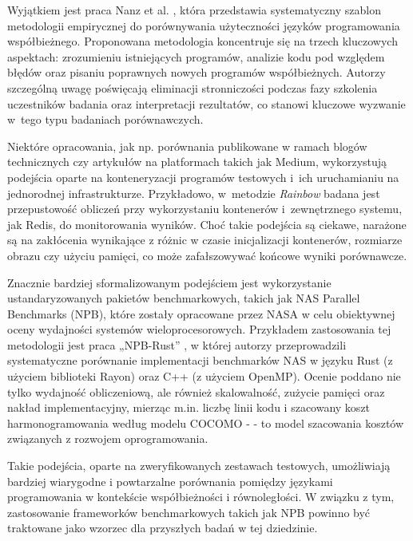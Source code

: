 Wyjątkiem jest praca Nanz et al. \cite{ConcurrentSemanticComparison_1}, która przedstawia systematyczny szablon metodologii empirycznej do porównywania użyteczności języków programowania współbieżnego. Proponowana metodologia koncentruje się na trzech kluczowych aspektach: zrozumieniu istniejących programów, analizie kodu pod względem błędów oraz pisaniu poprawnych nowych programów współbieżnych. Autorzy szczególną uwagę poświęcają eliminacji stronniczości podczas fazy szkolenia uczestników badania oraz interpretacji rezultatów, co stanowi kluczowe wyzwanie w~tego typu badaniach porównawczych.

Niektóre opracowania, jak np. porównania publikowane w ramach blogów technicznych czy artykułów na platformach takich jak Medium, wykorzystują podejścia oparte na konteneryzacji programów testowych i~ich uruchamianiu na jednorodnej infrastrukturze. Przykładowo, w~metodzie \textit{Rainbow} \cite{rainbow} badana jest przepustowość obliczeń przy wykorzystaniu kontenerów i~zewnętrznego systemu, jak Redis, do monitorowania wyników. Choć takie podejścia są ciekawe, narażone są na zakłócenia wynikające z różnic w czasie inicjalizacji kontenerów, rozmiarze obrazu czy użyciu pamięci, co może zafałszowywać końcowe wyniki porównawcze.

Znacznie bardziej sformalizowanym podejściem jest wykorzystanie ustandaryzowanych pakietów benchmarkowych, takich jak NAS Parallel Benchmarks (NPB), które zostały opracowane przez NASA w celu obiektywnej oceny wydajności systemów wieloprocesorowych. Przykładem zastosowania tej metodologii jest praca „NPB-Rust” \cite{martins2025npbrustnasparallelbenchmarks}, w której autorzy przeprowadzili systematyczne porównanie implementacji benchmarków NAS w języku Rust (z użyciem biblioteki Rayon) oraz C++ (z użyciem OpenMP). Ocenie poddano nie tylko wydajność obliczeniową, ale również skalowalność, zużycie pamięci oraz nakład implementacyjny, mierząc m.in. liczbę linii kodu i szacowany koszt harmonogramowania według modelu COCOMO -  - to model szacowania kosztów związanych z rozwojem oprogramowania.

Takie podejścia, oparte na zweryfikowanych zestawach testowych, umożliwiają bardziej wiarygodne i powtarzalne porównania pomiędzy językami programowania w kontekście współbieżności i równoległości. W związku z tym, zastosowanie frameworków benchmarkowych takich jak NPB powinno być traktowane jako wzorzec dla przyszłych badań w tej dziedzinie.

